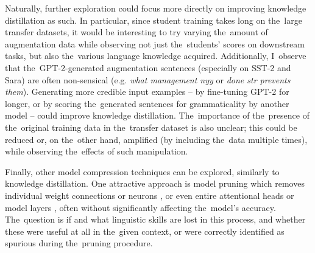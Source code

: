 \documentclass[bsc,frontabs,singlespacing,parskip,deptreport]{infthesis}
\begin{document}
{{    Naturally, further exploration could focus more directly on improving knowledge distillation as such.
    In particular, since student training takes long on the~large transfer datasets, it would be interesting to try varying the~amount of augmentation data while observing not just the~students' scores on downstream tasks, but also the~various language knowledge acquired.
    Additionally, I~observe that the~GPT-2-generated augmentation sentences (especially on SST-2 and Sara) are often non-sensical (e.g. \textit{what management nyy} or \textit{done str prevents them}). Generating more credible input examples -- by fine-tuning GPT-2 for longer, or by scoring the~generated sentences for grammaticality by another model -- could improve knowledge distillation. The~importance of the~presence of the~original training data in the~transfer dataset is also unclear; this could be reduced or, on the~other hand, amplified (by including the~data multiple times), while observing the~effects of such manipulation.

    Finally, other model compression techniques can be explored, similarly to knowledge distillation.
    One attractive approach is model pruning which removes individual weight connections or neurons \citep{Han_2015,Sajjad_2020}, or even entire attentional heads \citep{Michel_2019} or model layers \citep{Mao_2020}, often without significantly affecting the~model's accuracy.
    The~question is if and what linguistic skills are lost in this process, and whether these were useful at all in the~given context, or were correctly identified as spurious during the~pruning procedure.
  }
}




\appendix
\end{document}
